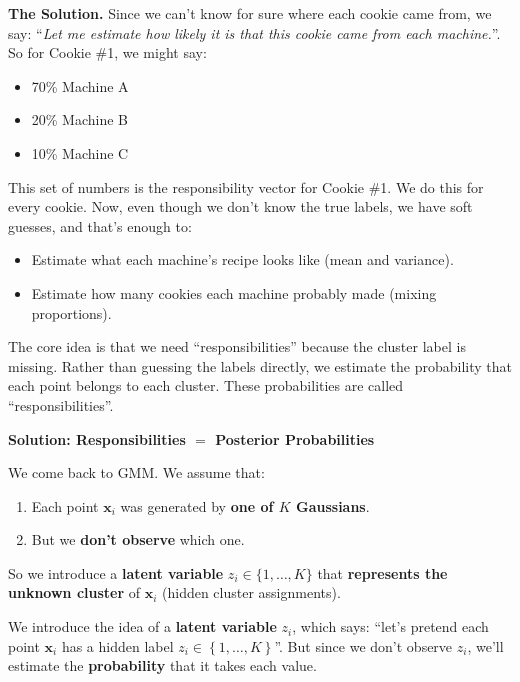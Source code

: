 \begin{examplebox}
    \textcolor{Green3}{ \textbf{The Solution.}} Since we can't know for sure where each cookie came from, we say: ``\emph{Let me estimate how likely it is that this cookie came from each machine.}''. So for Cookie \#1, we might say:
    \begin{itemize}
        \item 70\% Machine A
        \item 20\% Machine B
        \item 10\% Machine C
    \end{itemize}
    This set of numbers is the responsibility vector for Cookie \#1. We do this for every cookie. Now, even though we don't know the true labels, we have soft guesses, and that's enough to:
    \begin{itemize}
        \item Estimate what each machine's recipe looks like (mean and variance).
        \item Estimate how many cookies each machine probably made (mixing proportions).
    \end{itemize}

    The core idea is that we need ``responsibilities'' because the cluster label is missing. Rather than guessing the labels directly, we estimate the probability that each point belongs to each cluster. These probabilities are called ``responsibilities''.
\end{examplebox}

\newpage

\begin{flushleft}
    \textcolor{Green3}{ \textbf{Solution: Responsibilities $=$ Posterior Probabilities}}
\end{flushleft}
We come back to GMM. We assume that:
\begin{enumerate}
    \item Each point $\mathbf{x}_{i}$ was generated by \textbf{one of $K$ Gaussians}.
    \item But we \textbf{don't observe} which one.
\end{enumerate}
So we introduce a \textbf{latent variable} $z_{i} \in \{1, \dots, K\}$ that \textbf{represents the unknown cluster} of $\mathbf{x}_{i}$ (hidden cluster assignments).

\highspace
We introduce the idea of a \textbf{latent variable} $z_{i}$, which says: ``let's pretend each point $\mathbf{x}_{i}$ has a hidden label $z_{i} \in \left\{1, \dots, K\right\}$''. But since we don't observe $z_{i}$, we'll estimate the \textbf{probability} that it takes each value.


